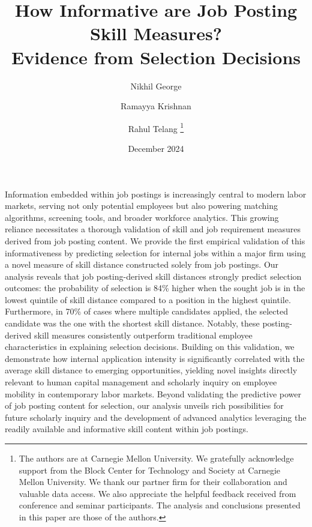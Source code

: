 \documentclass[letterpaper,11pt,leqno]{article}
\newcommand{\bib}{references.bib}
\begin{document}
\title{How Informative are Job Posting Skill Measures? \\ Evidence from Selection Decisions}
\author{%
 Nikhil George \and Ramayya Krishnan \and Rahul Telang%
 \thanks{The authors are at Carnegie Mellon University. We gratefully acknowledge support from the Block Center for Technology and Society at Carnegie Mellon University. We thank our partner firm for their collaboration and valuable data access. We also appreciate the helpful feedback received from conference and seminar participants. The analysis and conclusions presented in this paper are those of the authors.}%
}
\date{December 2024}

\begin{titlepage}
\maketitle

Information embedded within job postings is increasingly central to modern labor markets, serving not only potential employees but also powering 
matching algorithms, screening tools, and broader workforce analytics. This growing reliance necessitates a thorough validation of skill and job requirement 
measures derived from job posting content. We provide the first empirical validation of this informativeness by predicting selection for internal jobs within 
a major firm using a novel measure of skill distance constructed solely from job postings. Our analysis reveals that job posting-derived skill distances 
strongly predict selection outcomes: the probability of selection is 84\% higher when the sought job is in the lowest quintile of skill distance 
compared to a position in the highest quintile. Furthermore, in 70\% of cases where multiple candidates applied, the selected candidate 
was the one with the shortest skill distance. Notably, these posting-derived skill measures consistently outperform traditional employee 
characteristics in explaining selection decisions. Building on this validation, we demonstrate how internal application intensity is 
significantly correlated with the average skill distance to emerging opportunities, yielding novel insights directly relevant to 
human capital management and scholarly inquiry on employee mobility in contemporary labor markets. Beyond validating the predictive power 
of job posting content for selection, our analysis unveils rich possibilities for future scholarly inquiry and the development of 
advanced analytics leveraging the readily available and informative skill content within job postings.

\end{titlepage}











\appendix

\end{document}
